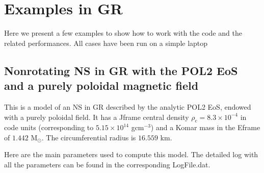 \documentclass[letterpaper,10pt,english]{sphinxmanual}
\begin{document}
\sphinxstepscope


\chapter{Examples in GR}
\label{\detokenize{examples_gr:examples-in-gr}}\label{\detokenize{examples_gr::doc}}
\sphinxAtStartPar
Here we present a few examples to show how to work with the code and the related performances. All
cases have been run on a simple laptop


\section{Non\sphinxhyphen{}rotating NS in GR with the POL2 EoS and a purely poloidal magnetic field}
\label{\detokenize{examples_gr:non-rotating-ns-in-gr-with-the-pol2-eos-and-a-purely-poloidal-magnetic-field}}
\sphinxAtStartPar
This is a model of an NS in GR described by the analytic POL2 EoS, endowed with a purely poloidal field. It has a J\sphinxhyphen{}frame central density \(\rho _\mathrm{c}=8.3\times 10^{-4}\) in code units (corresponding to \(5.15\times 10^{14}\) gcm\(^{-3}\)) and a Komar mass in the E\sphinxhyphen{}frame of \(1.442\) M\( _\odot\). The circumferential radius is \(16.559\) km.

\sphinxAtStartPar
Here are the main parameters used to compute this model. The detailed log with all the parameters can be found in the corresponding LogFile.dat.
\end{document}
